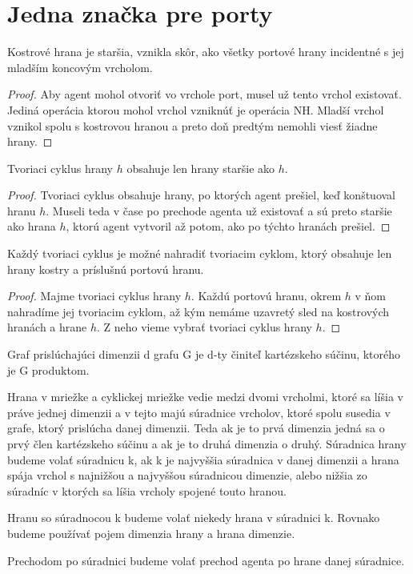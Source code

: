 \section{Jedna značka pre porty}

\begin{veta}
Kostrové hrana je staršia, vznikla skôr, ako všetky portové hrany incidentné
s jej mladším koncovým vrcholom.
\end{veta}
\begin{proof}
Aby agent mohol otvoriť vo vrchole port, musel už tento vrchol existovať.
Jediná operácia ktorou mohol vrchol vzniknúť je operácia NH. Mladší vrchol
vznikol spolu s kostrovou hranou a preto doň predtým nemohli viesť žiadne
hrany.
\end{proof}


\begin{veta}
Tvoriaci cyklus hrany $h$ obsahuje len hrany staršie ako $h$.
\end{veta}
\begin{proof}
Tvoriaci cyklus obsahuje hrany, po ktorých agent prešiel, keď konštuoval
hranu $h$. Museli teda v čase po prechode agenta už existovať a sú preto 
staršie ako hrana $h$, ktorú agent vytvoril až potom, ako po týchto hranách
prešiel.
\end{proof}


\begin{veta}
\label{cyklus}
Každý tvoriaci cyklus je možné nahradiť tvoriacim cyklom, ktorý obsahuje len
hrany kostry a príslušnú portovú hranu.
\end{veta}
\begin{proof}
Majme tvoriaci cyklus hrany $h$. Každú portovú hranu, okrem $h$  v ňom nahradíme 
jej tvoriacim
cyklom, až kým nemáme uzavretý sled na kostrových hranách a hrane $h$. Z
neho vieme vybrať tvoriaci cyklus hrany $h$.
\end{proof}



\begin{ozn}
Graf prislúchajúci dimenzii d grafu G je d-ty činiteľ kartézskeho súčinu, ktorého
je G produktom.
\end{ozn}

\begin{ozn}
Hrana v mriežke a cyklickej mriežke vedie medzi dvomi vrcholmi, 
ktoré sa líšia v práve jednej dimenzii a v tejto majú súradnice vrcholov,
ktoré spolu susedia v grafe, ktorý prislúcha danej dimenzii. Teda ak je to
prvá dimenzia jedná sa o prvý člen kartézskeho súčinu a ak je to druhá
dimenzia o druhý. Súradnica hrany budeme volať súradnicu k, ak k je
najvyššia súradnica v danej dimenzii a hrana spája vrchol s najnižšou a
najvyššou súradnicou dimenzie, alebo nižšia zo súradníc v ktorých sa líšia
vrcholy spojené touto hranou.

Hranu so súradnocou k budeme volať niekedy hrana v súradnici k. Rovnako
budeme používať pojem dimenzia hrany a hrana dimenzie.
\end{ozn}
\begin{ozn}
Prechodom po súradnici budeme volať prechod agenta po hrane danej súradnice.
\end{ozn}

